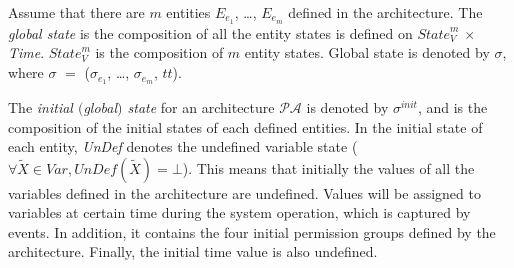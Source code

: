 \documentclass[a4paper]{article}
\begin{document}
\begin{center}
\noindent{}
\end{center}

Assume that there are $m$ entities $E_{e_1}$, \dots, $E_{e_m}$ defined in the architecture. The \textit{global state} is the composition of all the entity states is defined on $\textit{State}_{V}^m$ $\times$ \textit{Time}. $\textit{State}_{V}^m$ is the composition of $m$ entity states. Global state is denoted by $\sigma$, where $\sigma$ $=$ ($\sigma_{e_1}$, \dots, $\sigma_{e_m}$, $tt$). 

\begin{center}
\noindent{}
\end{center}

The \textit{initial $($global$)$ state} for an architecture $\mathcal{P}\mathcal{A}$ is denoted by $\sigma^{init}$, and is the composition of the initial states of each defined entities. In the initial state of each entity, \textit{UnDef} denotes the undefined variable state ($\forall \tilde{X} \in \textit{Var}, \textit{UnDef}(\tilde{X}) = \bot$). This means that initially the values of all the variables defined in the architecture are undefined. Values will be assigned to variables at certain time during the system operation, which is captured by events. In addition, it contains the four initial permission groups defined by the architecture. Finally, the initial time value is also undefined.

\begin{center}
\noindent{}
\end{center}
\end{document}
